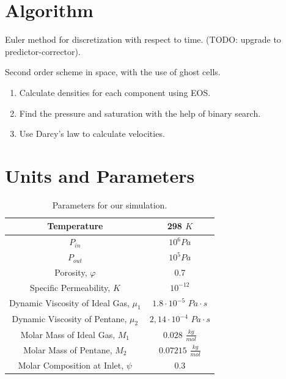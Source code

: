\documentclass[a4paper,12pt]{article}
\begin{document}
\section{Algorithm}

Euler method for discretization with respect to time.
(TODO: upgrade to predictor-corrector).

Second order scheme in space, with the use of ghost cells. 

\begin{enumerate}
    \item Calculate densities for each component using EOS.
    \item Find the pressure and saturation with the
        help of binary search.
    \item Use Darcy's law to calculate velocities.
\end{enumerate}

\section{Units and Parameters}

\begin{table}[H]
    \centering
    \caption{Parameters for our simulation.}
    \label{tab:label}
    \begin{tabular}{| c | c |}
        \hline
        Temperature & 298 \(K\) \\
        \hline
        \(P_{in}\) & \(10^6 Pa\) \\
        \hline
        \(P_{out}\) & \(10^5 Pa\) \\
        \hline
        Porosity, \(\varphi\) & 0.7 \\
        \hline
        Specific Permeability, \(K\) & \(10^{-12}\) \\
        \hline
        Dynamic Viscosity of Ideal Gas, \(\mu_1\) &
        \(1.8 \cdot 10^{-5}\) \(Pa \cdot s\) \\
        \hline
        Dynamic Viscosity of Pentane, \(\mu_2\) &
        \(2,14 \cdot 10^{-4}\) \( Pa \cdot s\) \\
        \hline
        Molar Mass of Ideal Gas, \(M_1\) & 
        \(0.028\) \(\frac{kg}{mol}\) \\
        \hline
        Molar Mass of Pentane, \(M_2\) & 
        \(0.07215\) \(\frac{kg}{mol}\) \\
        \hline
        Molar Composition at Inlet, \(\psi\) &
        \(0.3\) \\
        \hline
    \end{tabular}
\end{table}
\end{document}
